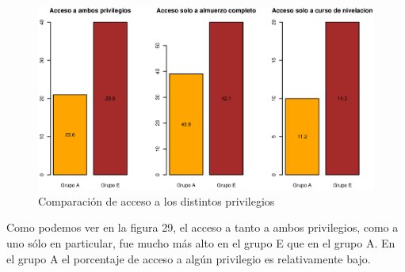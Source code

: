 \documentclass{article}
\begin{document}
    \begin{figure}[H]
            \includegraphics[scale = 0.7]{Output/Plots/privilegios.eps}
            \vspace*{-6mm}
            \caption{Comparaci\'on de acceso a los distintos privilegios}
    \end{figure}

    Como podemos ver en la figura 29, el acceso a tanto a ambos privilegios, como a uno s\'olo en particular,
    fue mucho m\'as alto en el grupo E que en el grupo A. En el grupo A el porcentaje de acceso a alg\'un privilegio
    es relativamente bajo.
    
\end{document}
